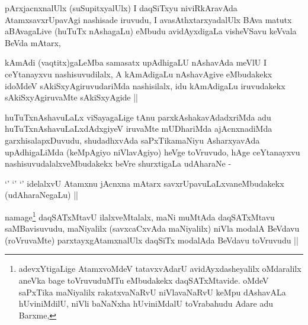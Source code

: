 \begin{artha}
pArxjacnxnalUlx (suSupitxyalUlx) I daqSiTxyu niviRkAravAda
AtamxsavxrUpavAgi nashisade iruvudu, I avasAthxtarxyadalUlx BAva
matutx aBAvagaLive (huTuTx nAshagaLu) eMbudu avidAyxdigaLa visheVSavu
keVvala BeVda mAtarx,
\end{artha}


\begin{artha}
kAmAdi (vaqtitx)gaLeMba samasatx upAdhigaLU nAshavAda meVlU I
ceYtanayxvu nashisuvudilalx, A kAmAdigaLu nAshavAgive eMbudakekx
idoMdeV sAkiSxyAgiruvudariMda nashisilalx, idu kAmAdigaLu iruvudakekx
sAkiSxyAgiruvaMte sAkiSxyAgide ||
\end{artha}


\begin{artha}
huTuTxnAshavuLaLx viSayagaLige tAnu parxkAshakavAdadxriMda adu
huTuTxnAshavuLaLxdAdxgiyeV iruvaMte mUDhariMda ajAcnxnadiMda
garxhisalapxDuvudu, shudadhxvAda saPxTikamaNiyu AsharxyavAda
upAdhigaLiMda (keMpAgiyo niVlavAgiyo) heVge toVruvudo, hAge
ceYtanayxvu nashisuvudalalxveMbudakekx beVre shurxtigaLa udAharaNe -
\end{artha}

\begin{artha}
`\stext' `\stext' `\stext' idelalxvU Atamxnu jAcnxna mAtarx
  savxrUpavuLaLxvaneMbudakekx (udAharaNegaLu) ||
\end{artha}


\begin{artha}
namage\footnote[1]{adevxYtigaLige AtamxvoMdeV tatavxvAdarU
  avidAyxdasheyalilx oMdaralilx aneVka bage toVruvuduMTu eMbudakekx
  daqSATxMtavide. oMdeV saPxTika maNiyalilx rakatxvaNaRvU niVlavaNaRvU
  keMpu dAshavALa hUviniMdilU, niVli baNaNxha hUviniMdalU toVrabahudu
  Adare adu Barxme,} daqSATxMtavU ilalxveMtalalx, maNi muMtAda
daqSATxMtavu saMBavisuvudu, maNiyalilx (savxcaCxvAda maNiyalilx) niVla
modalA BeVdavu (roVruvaMte) parxtayxgAtamxnalUlx daqSiTx modalAda
BeVdavu toVruvudu ||
\end{artha}


